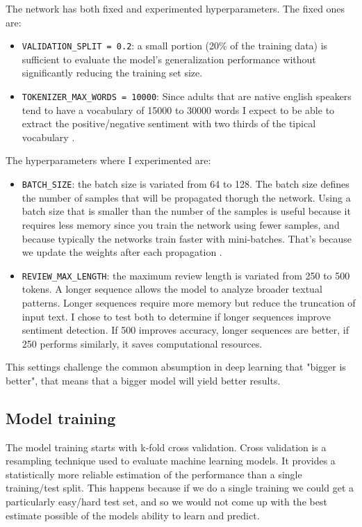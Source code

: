 \documentclass{article}
\begin{document}
The network has both fixed and experimented hyperparameters.
The fixed ones are:
\begin{itemize}
  \item \verb|VALIDATION_SPLIT = 0.2|: a small portion (20\% of the training data) is sufficient to evaluate the model's generalization performance without significantly reducing the training set size.
  \item \verb|TOKENIZER_MAX_WORDS = 10000|: Since adults that are native english speakers tend to have a vocabulary of 15000 to 30000 words I expect to be able to extract the positive/negative sentiment with two thirds of the tipical vocabulary \cite{babbelDoesYour}.
\end{itemize}

The hyperparameters where I experimented are:
\begin{itemize}
  \item \verb|BATCH_SIZE|: the batch size is variated from 64 to 128. The batch size defines the number of samples that will be propagated thorugh the network. Using a batch size that is smaller than the number of the samples is useful because it requires less memory since you train the network using fewer samples, and because typically the networks train faster with mini-batches.
  That's because we update the weights after each propagation \cite{stackexchangeWhatBatch}.
  \item \verb|REVIEW_MAX_LENGTH|: the maximum review length is variated from 250 to 500 tokens. A longer sequence allows the model to analyze broader textual patterns. Longer sequences require more memory but reduce the truncation of input text. I chose to test both to determine if longer sequences improve sentiment detection. If 500 improves accuracy, longer sequences are better, if 250 performs similarly, it saves computational resources.
\end{itemize}

This settings challenge the common absumption in deep learning that "bigger is better", that means that a bigger model will yield better results.

\subsection{Model training}

The model training starts with k-fold cross validation.
Cross validation is a resampling technique used to evaluate machine learning models.
It provides a statistically more reliable estimation of the performance than a single training/test split.
This happens because if we do a single training we could get a particularly easy/hard test set, and so we would not come up with the best estimate possible of the models ability to learn and predict.
\end{document}
